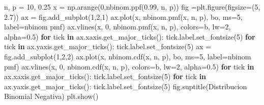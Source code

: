 \documentclass[
  letterpaper,
  DIV=11,
  numbers=noendperiod]{scrreprt}
\newenvironment{Shaded}{\begin{snugshade}}{\end{snugshade}}
\newcommand{\ControlFlowTok}[1]{\textcolor[rgb]{0.00,0.23,0.31}{\textbf{#1}}}
\newcommand{\DecValTok}[1]{\textcolor[rgb]{0.68,0.00,0.00}{#1}}
\newcommand{\FloatTok}[1]{\textcolor[rgb]{0.68,0.00,0.00}{#1}}
\newcommand{\KeywordTok}[1]{\textcolor[rgb]{0.00,0.23,0.31}{\textbf{#1}}}
\newcommand{\NormalTok}[1]{\textcolor[rgb]{0.00,0.23,0.31}{#1}}
\newcommand{\OperatorTok}[1]{\textcolor[rgb]{0.37,0.37,0.37}{#1}}
\newcommand{\StringTok}[1]{\textcolor[rgb]{0.13,0.47,0.30}{#1}}
\begin{document}
\begin{Shaded}
\begin{Highlighting}[]
\NormalTok{n, p }\OperatorTok{=} \DecValTok{10}\NormalTok{, }\FloatTok{0.25}
\NormalTok{x }\OperatorTok{=}\NormalTok{ np.arange(}\DecValTok{0}\NormalTok{,nbinom.ppf(}\FloatTok{0.99}\NormalTok{, n, p))}
\NormalTok{fig }\OperatorTok{=}\NormalTok{plt.figure(figsize}\OperatorTok{=}\NormalTok{(}\DecValTok{5}\NormalTok{, }\FloatTok{2.7}\NormalTok{))}
\NormalTok{ax }\OperatorTok{=}\NormalTok{ fig.add\_subplot(}\DecValTok{1}\NormalTok{,}\DecValTok{2}\NormalTok{,}\DecValTok{1}\NormalTok{)}
\NormalTok{ax.plot(x, nbinom.pmf(x, n, p), }\StringTok{\textquotesingle{}bo\textquotesingle{}}\NormalTok{, ms}\OperatorTok{=}\DecValTok{5}\NormalTok{, label}\OperatorTok{=}\StringTok{\textquotesingle{}nbinom pmf\textquotesingle{}}\NormalTok{)}
\NormalTok{ax.vlines(x, }\DecValTok{0}\NormalTok{, nbinom.pmf(x, n, p), colors}\OperatorTok{=}\StringTok{\textquotesingle{}b\textquotesingle{}}\NormalTok{, lw}\OperatorTok{=}\DecValTok{2}\NormalTok{, alpha}\OperatorTok{=}\FloatTok{0.5}\NormalTok{)}
\ControlFlowTok{for}\NormalTok{ tick }\KeywordTok{in}\NormalTok{ ax.xaxis.get\_major\_ticks():}
\NormalTok{  tick.label.set\_fontsize(}\DecValTok{5}\NormalTok{)}
\ControlFlowTok{for}\NormalTok{ tick }\KeywordTok{in}\NormalTok{ ax.yaxis.get\_major\_ticks():}
\NormalTok{  tick.label.set\_fontsize(}\DecValTok{5}\NormalTok{) }
\NormalTok{ax }\OperatorTok{=}\NormalTok{ fig.add\_subplot(}\DecValTok{1}\NormalTok{,}\DecValTok{2}\NormalTok{,}\DecValTok{2}\NormalTok{)}
\NormalTok{ax.plot(x, nbinom.cdf(x, n, p), }\StringTok{\textquotesingle{}bo\textquotesingle{}}\NormalTok{, ms}\OperatorTok{=}\DecValTok{5}\NormalTok{, label}\OperatorTok{=}\StringTok{\textquotesingle{}nbinom pmf\textquotesingle{}}\NormalTok{)}
\NormalTok{ax.vlines(x, }\DecValTok{0}\NormalTok{, nbinom.cdf(x, n, p), colors}\OperatorTok{=}\StringTok{\textquotesingle{}b\textquotesingle{}}\NormalTok{, lw}\OperatorTok{=}\DecValTok{2}\NormalTok{, alpha}\OperatorTok{=}\FloatTok{0.5}\NormalTok{)}
\ControlFlowTok{for}\NormalTok{ tick }\KeywordTok{in}\NormalTok{ ax.xaxis.get\_major\_ticks():}
\NormalTok{  tick.label.set\_fontsize(}\DecValTok{5}\NormalTok{)}
\ControlFlowTok{for}\NormalTok{ tick }\KeywordTok{in}\NormalTok{ ax.yaxis.get\_major\_ticks():}
\NormalTok{  tick.label.set\_fontsize(}\DecValTok{5}\NormalTok{)}
\NormalTok{fig.suptitle(}\StringTok{\textquotesingle{}Distribucion Binomial Negativa\textquotesingle{}}\NormalTok{)}
\NormalTok{plt.show()}
\end{Highlighting}
\end{Shaded}
\end{document}
